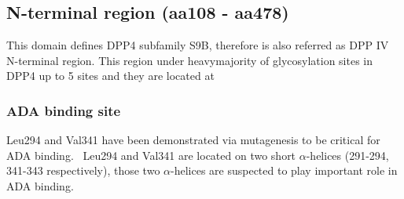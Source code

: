 \subsection{N-terminal region (aa108 - aa478)}

This domain defines DPP4 subfamily S9B, therefore is also referred as DPP IV N-terminal region. This region under heavymajority of  glycosylation sites in DPP4 up to 5 sites and they are located at  

\subsubsection{ADA binding site}
Leu294 and Val341 have been demonstrated via mutagenesis to be critical for ADA binding.~\cite{Abbott_1999} Leu294 and Val341 are located on two short $\alpha$-helices (291-294, 341-343 respectively), those two $\alpha$-helices are suspected to play important role in ADA binding. 